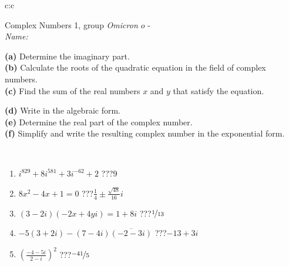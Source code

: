 \documentclass[10pt]{report}
\newcommand\omicron{o}
\begin{document}
\begin{tabular}{c:c}
\begin{minipage}[c][104.5mm][t]{0.5\linewidth}
\begin{center}
\vspace{5mm}
{\huge Complex Numbers 1, group \textit{Omicron $\omicron$} -}\\[5mm]
\textit{Name:}\phantom{xxxxxxxxxxxxxxxxxxxxxxxxxxxxxxxxxxxxxxxxxxxxxxxxxxxxxxxxxxxxxxxxx}\\[5mm]
\begin{minipage}{0.95\linewidth}
\begin{center}
{\small \begin{minipage}{0.44\textwidth} \raggedright
\textbf{(a)} Determine the imaginary part. \\[1mm]
\textbf{(b)} Calculate the roots of the quadratic equation in the field of complex numbers. \\[1mm]
\textbf{(c)} Find the sum of the real numbers \(x\) and \(y\) that satisfy the equation. \end{minipage} \begin{minipage}{0.54\textwidth}
\textbf{(d)} Write in the algebraic form. \\[1mm]
\textbf{(e)} Determine the real part of the complex number. \\[1mm]
\textbf{(f)} Simplify and write the resulting complex number in the exponential form.
\end{minipage}
} \vspace{3mm}
\end{center}
\end{minipage}
\\[1mm]
\begin{minipage}{0.79\linewidth}
\begin{center}
\begin{varwidth}{\linewidth}
\setlength{\itemsep}{0pt}
\begin{enumerate}
\large
\item $i^{829}+8i^{581}+3i^{-62}+2$\quad \dotfill\; ???\;\dotfill \quad $9$
\item $8x^2-4x+1=0$\quad \dotfill\; ???\;\dotfill \quad $\frac{1}{4} \pm{}\frac{ \sqrt{48}}{16}i$
\item $(3-2i)(-2x+4yi)=1+8i$\quad \dotfill\; ???\;\dotfill \quad $\nicefrac{1}{13}$
\item $-5(3+2i)-(7-4i)\overline{(-2-3i)}$\quad \dotfill\; ???\;\dotfill \quad $-13+3i$
\item $\left(\frac{-4-5i}{2-i}\right)^2$\quad \dotfill\; ???\;\dotfill \quad $\nicefrac{-41}{5}$

\end{enumerate}
\end{varwidth}
\end{center}
\end{minipage}
\end{center}
\end{minipage}
\end{tabular}
\end{document}
